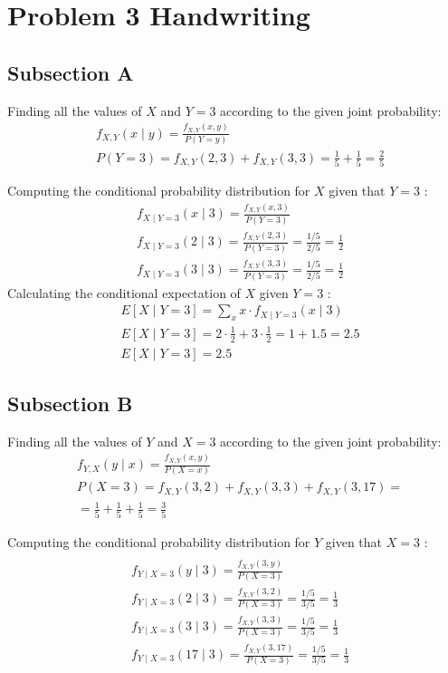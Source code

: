 \documentclass[a4paper,11pt]{article}
\theoremstyle{mytheor}
\begin{document}
\newpage
\section{Problem 3 Handwriting}
\subsection{Subsection A}
Finding all the values of $X$ and $Y=3$ according to the given joint probability:
$$
\begin{aligned}
& f_{X, Y}(x \mid y)=\frac{f_{X, Y}(x, y)}{P(Y=y)} \\
& P(Y=3)=f_{X, Y}(2,3)+f_{X, Y}(3,3)=\frac{1}{5}+\frac{1}{5}=\frac{2}{5}
\end{aligned}
$$

Computing the conditional probability distribution for $X$ given that $Y=3$ :
$$
\begin{aligned}
& f_{X \mid Y=3}(x \mid 3)=\frac{f_{X, Y}(x, 3)}{P(Y=3)} \\
& f_{X \mid Y=3}(2 \mid 3)=\frac{f_{X, Y}(2,3)}{P(Y=3)}=\frac{1 / 5}{2 / 5}=\frac{1}{2} \\
& f_{X \mid Y=3}(3 \mid 3)=\frac{f_{X, Y}(3,3)}{P(Y=3)}=\frac{1 / 5}{2 / 5}=\frac{1}{2}
\end{aligned}
$$
Calculating the conditional expectation of $X$ given $Y=3$ :
$$
\begin{aligned}
& E[X \mid Y=3]=\sum_x x \cdot f_{X \mid Y=3}(x \mid 3) \\
& E[X \mid Y=3]=2 \cdot \frac{1}{2}+3 \cdot \frac{1}{2}=1+1.5=2.5 \\
& E[X \mid Y=3]=2.5
\end{aligned}
$$

\subsection{Subsection B}
Finding all the values of $Y$ and $X=3$ according to the given joint probability:
$$
\begin{aligned}
& f_{Y, X}(y \mid x)=\frac{f_{X, Y}(x, y)}{P(X=x)} \\
& P(X=3)=f_{X, Y}(3,2)+f_{X, Y}(3,3)+f_{X, Y}(3,17)= \\
& =\frac{1}{5}+\frac{1}{5}+\frac{1}{5}=\frac{3}{5}
\end{aligned}
$$

Computing the conditional probability distribution for $Y$ given that $X=3$ :
$$
\begin{aligned}\\
&f_{Y \mid X=3}(y \mid 3)=\frac{f_{X, Y}(3, y)}{P(X=3)}\\
& f_{Y \mid X=3}(2 \mid 3)=\frac{f_{X, Y}(3,2)}{P(X=3)}=\frac{1 / 5}{3 / 5}=\frac{1}{3} \\
& f_{Y \mid X=3}(3 \mid 3)=\frac{f_{X, Y}(3,3)}{P(X=3)}=\frac{1 / 5}{3 / 5}=\frac{1}{3} \\
& f_{Y \mid X=3}(17 \mid 3)=\frac{f_{X, Y}(3,17)}{P(X=3)}=\frac{1 / 5}{3 / 5}=\frac{1}{3}
\end{aligned}
$$
\end{document}
